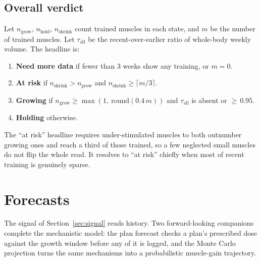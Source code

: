 \documentclass[11pt,a4paper]{article}
\begin{document}
\subsection{Overall verdict}\label{sec:overall}
Let $n_{\text{grow}}$, $n_{\text{hold}}$, $n_{\text{shrink}}$ count trained muscles in each state, and $m$ be the number of trained muscles. Let $\tau_{\text{all}}$ be the recent-over-earlier ratio of whole-body weekly volume. The headline is:
\begin{enumerate}[label=\arabic*.,leftmargin=*]
\item \textbf{Need more data} if fewer than 3 weeks show any training, or $m=0$.
\item \textbf{At risk} if $n_{\text{shrink}} > n_{\text{grow}}$ and $n_{\text{shrink}} \geq \lceil m/3 \rceil$.
\item \textbf{Growing} if $n_{\text{grow}} \geq \max\!\left(1,\ \mathrm{round}(0.4\,m)\right)$ and $\tau_{\text{all}}$ is absent or ${\geq}\,0.95$.
\item \textbf{Holding} otherwise.
\end{enumerate}
The ``at risk'' headline requires under-stimulated muscles to both outnumber growing ones and reach a third of those trained, so a few neglected small muscles do not flip the whole read. It resolves to ``at risk'' chiefly when most of recent training is genuinely sparse.

\section{Forecasts}\label{sec:forecasts}
The signal of Section~\ref{sec:signal} reads history. Two forward-looking companions complete the mechanistic model: the plan forecast checks a plan's prescribed dose against the growth window before any of it is logged, and the Monte Carlo projection turns the same mechanisms into a probabilistic muscle-gain trajectory.
\end{document}
